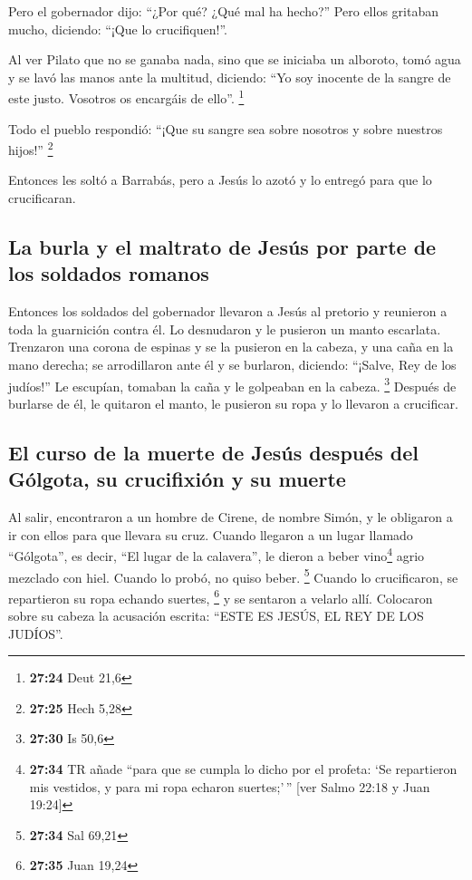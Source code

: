  Pero el gobernador dijo: ``¿Por qué? ¿Qué mal ha
hecho?'' Pero ellos gritaban mucho, diciendo: ``¡Que lo crucifiquen!''.

 Al ver Pilato que no se ganaba nada, sino que se
iniciaba un alboroto, tomó agua y se lavó las manos ante la multitud,
diciendo: ``Yo soy inocente de la sangre de este justo. Vosotros os
encargáis de ello''. \footnote{\textbf{27:24} Deut 21,6}

 Todo el pueblo respondió: ``¡Que su sangre sea sobre
nosotros y sobre nuestros hijos!'' \footnote{\textbf{27:25} Hech 5,28}

 Entonces les soltó a Barrabás, pero a Jesús lo azotó y
lo entregó para que lo crucificaran.

\hypertarget{la-burla-y-el-maltrato-de-jesuxfas-por-parte-de-los-soldados-romanos}{%
\subsection{La burla y el maltrato de Jesús por parte de los soldados
romanos}\label{la-burla-y-el-maltrato-de-jesuxfas-por-parte-de-los-soldados-romanos}}

 Entonces los soldados del gobernador llevaron a Jesús al
pretorio y reunieron a toda la guarnición contra él.  Lo
desnudaron y le pusieron un manto escarlata.  Trenzaron
una corona de espinas y se la pusieron en la cabeza, y una caña en la
mano derecha; se arrodillaron ante él y se burlaron, diciendo: ``¡Salve,
Rey de los judíos!''  Le escupían, tomaban la caña y le
golpeaban en la cabeza. \footnote{\textbf{27:30} Is 50,6}
 Después de burlarse de él, le quitaron el manto, le
pusieron su ropa y lo llevaron a crucificar.

\hypertarget{el-curso-de-la-muerte-de-jesuxfas-despuuxe9s-del-guxf3lgota-su-crucifixiuxf3n-y-su-muerte}{%
\subsection{El curso de la muerte de Jesús después del Gólgota, su
crucifixión y su
muerte}\label{el-curso-de-la-muerte-de-jesuxfas-despuuxe9s-del-guxf3lgota-su-crucifixiuxf3n-y-su-muerte}}

 Al salir, encontraron a un hombre de Cirene, de nombre
Simón, y le obligaron a ir con ellos para que llevara su cruz.
 Cuando llegaron a un lugar llamado ``Gólgota'', es
decir, ``El lugar de la calavera'',  le dieron a beber
vino\footnote{\textbf{27:34} TR añade ``para que se cumpla lo dicho por
  el profeta: `Se repartieron mis vestidos, y para mi ropa echaron
  suertes;'\,'' {[}ver Salmo 22:18 y Juan 19:24{]}} agrio mezclado con
hiel. Cuando lo probó, no quiso beber. \footnote{\textbf{27:34} Sal
  69,21}  Cuando lo crucificaron, se repartieron su ropa
echando suertes, \footnote{\textbf{27:35} Juan 19,24}  y
se sentaron a velarlo allí.  Colocaron sobre su cabeza la
acusación escrita: ``ESTE ES JESÚS, EL REY DE LOS JUDÍOS''.

